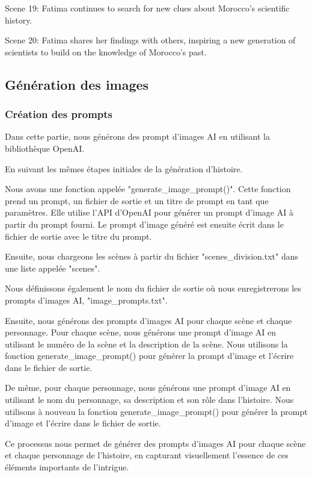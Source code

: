 \documentclass[11,5pt]{report}
\begin{document}
\begin{spacing}{2}
Scene 19: Fatima continues to search for new clues about Morocco's scientific history.

Scene 20: Fatima shares her findings with others, inspiring a new generation of scientists to build on the knowledge of Morocco's past.

\subsection{Génération des images}
\subsubsection{Création des prompts}
Dans cette partie, nous générons des prompt d'images AI en utilisant la bibliothèque OpenAI\cite{OpenAIDocs}\cite{OpenAIGit}.

En suivant les mêmes étapes initiales de la génération d'histoire.

Nous avons  une fonction appelée "generate\_image\_prompt()". Cette fonction prend un prompt, un fichier de sortie et un titre de prompt en tant que paramètres. Elle utilise l'API d'OpenAI\cite{OpenAIDocs} pour générer un prompt d'image AI à partir du prompt fourni. Le prompt d'image généré est ensuite écrit dans le fichier de sortie avec le titre du prompt.

Ensuite, nous chargeons les scènes à partir du fichier "scenes\_division.txt" dans une liste appelée "scenes".

Nous définissons également le nom du fichier de sortie où nous enregistrerons les prompts d'images AI, "image\_prompts.txt".

Ensuite, nous générons des prompts d'images AI pour chaque scène et chaque personnage. Pour chaque scène, nous générons une prompt d'image AI en utilisant le numéro de la scène et la description de la scène. Nous utilisons la fonction generate\_image\_prompt() pour générer la prompt d'image et l'écrire dans le fichier de sortie.

De même, pour chaque personnage, nous générons une prompt d'image AI en utilisant le nom du personnage, sa description et son rôle dans l'histoire. Nous utilisons à nouveau la fonction generate\_image\_prompt() pour générer la prompt d'image et l'écrire dans le fichier de sortie.

Ce processus nous permet de générer des prompts d'images AI pour chaque scène et chaque personnage de l'histoire, en capturant visuellement l'essence de ces éléments importants de l'intrigue.


\end{spacing}
\end{document}
